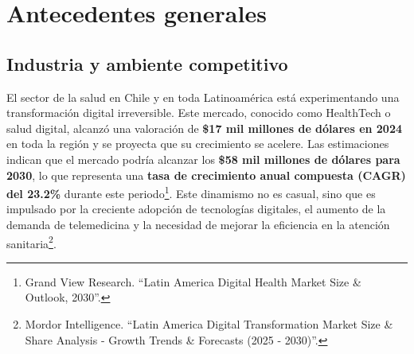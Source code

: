 %
%




\section{Antecedentes generales}
\subsection{Industria y ambiente competitivo}


El sector de la salud en Chile y en toda Latinoamérica está experimentando una transformación digital irreversible. Este mercado, conocido como HealthTech o salud digital, alcanzó una valoración de \textbf{\$17 mil millones de dólares en 2024} en toda la región y se proyecta que su crecimiento se acelere. Las estimaciones indican que el mercado podría alcanzar los \textbf{\$58 mil millones de dólares para 2030}, lo que representa una \textbf{tasa de crecimiento anual compuesta (CAGR) del 23.2\%} durante este periodo\footnote{Grand View Research. ``Latin America Digital Health Market Size \& Outlook, 2030''.}. Este dinamismo no es casual, sino que es impulsado por la creciente adopción de tecnologías digitales, el aumento de la demanda de telemedicina y la necesidad de mejorar la eficiencia en la atención sanitaria\footnote{Mordor Intelligence. ``Latin America Digital Transformation Market Size \& Share Analysis - Growth Trends \& Forecasts (2025 - 2030)''.}.

